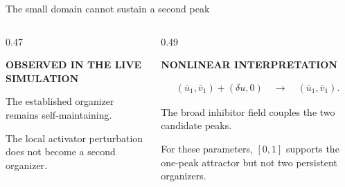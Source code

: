 \begin{frame}{The small domain cannot sustain a second peak}

  \vspace{-0.14cm}

  \begin{columns}[c,onlytextwidth]
    \begin{column}{0.47\textwidth}
      {\color{HydraGold}\bfseries\fontsize{7.7}{9.2}\selectfont
        OBSERVED IN THE LIVE SIMULATION\par}

      \vspace{0.14cm}

        {The established organizer remains self-maintaining.}

      \vspace{-0.12cm}

        {The local activator perturbation does not become a second organizer.}
    \end{column}

    \begin{column}{0.49\textwidth}
      {\color{HydraCyan}\bfseries\fontsize{7.7}{9.2}\selectfont
        NONLINEAR INTERPRETATION\par}

      \vspace{-0.12cm}

      {\color{HydraWhite}\fontsize{10.2}{13}\selectfont
      \begin{align*}
        (\bar u_1,\bar v_1)+(\delta u,0)
        \quad\longrightarrow\quad
        (\bar u_1,\bar v_1).
      \end{align*}
      }

      \vspace{-0.32cm}

        {The broad inhibitor field couples the two candidate peaks.}

      \vspace{-0.12cm}

        {For these parameters, $[0,1]$ supports the one-peak attractor but not two persistent organizers.}
    \end{column}
  \end{columns}

  \vspace{0.02cm}

\end{frame}


